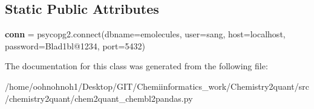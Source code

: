 \subsection*{Static Public Attributes}
\begin{DoxyCompactItemize}
\item
\mbox{\label{classchemistry2quant_1_1chem2quant__chembl2pandas_1_1chemblConnect_aa102734757bfb1cee082f73e815ae6bd}}
{\bfseries conn} = psycopg2.\+connect(dbname=\textquotesingle{}emolecules\textquotesingle{}, user=\textquotesingle{}sang\textquotesingle{}, host=\textquotesingle{}localhost\textquotesingle{}, password=\textquotesingle{}Blad1bl@1234\textquotesingle{}, port=5432)
\end{DoxyCompactItemize}


The documentation for this class was generated from the following file\+:\begin{DoxyCompactItemize}
\item
/home/oohnohnoh1/\+Desktop/\+G\+I\+T/\+Chemiinformatics\+\_\+work/\+Chemistry2quant/src/chemistry2quant/chem2quant\+\_\+chembl2pandas.\+py\end{DoxyCompactItemize}
